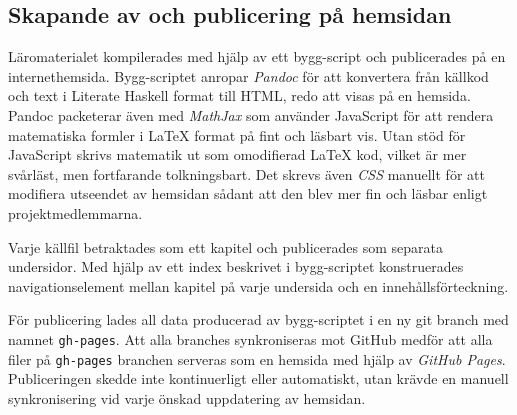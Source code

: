 \begin{draft}

\section{Skapande av och publicering på hemsidan}

Läromaterialet kompilerades med hjälp av ett bygg-script och
publicerades på en internethemsida. Bygg-scriptet anropar
\textit{Pandoc} för att konvertera från källkod och text i Literate
Haskell format till HTML, redo att visas på en hemsida. Pandoc
packeterar även med \textit{MathJax} som använder JavaScript för att
rendera matematiska formler i LaTeX format på fint och läsbart
vis. Utan stöd för JavaScript skrivs matematik ut som omodifierad
LaTeX kod, vilket är mer svårläst, men fortfarande tolkningsbart. Det
skrevs även \textit{CSS} manuellt för att modifiera utseendet av
hemsidan sådant att den blev mer fin och läsbar enligt
projektmedlemmarna.

Varje källfil betraktades som ett kapitel och publicerades som
separata undersidor. Med hjälp av ett index beskrivet i bygg-scriptet
konstruerades navigationselement mellan kapitel på varje undersida
och en innehållsförteckning.

För publicering lades all data producerad av bygg-scriptet i en ny git
branch med namnet \texttt{gh-pages}. Att alla branches synkroniseras
mot GitHub medför att alla filer på \texttt{gh-pages} branchen
serveras som en hemsida med hjälp av \textit{GitHub
  Pages}. Publiceringen skedde inte kontinuerligt eller automatiskt,
utan krävde en manuell synkronisering vid varje önskad uppdatering av
hemsidan.

\end{draft}
